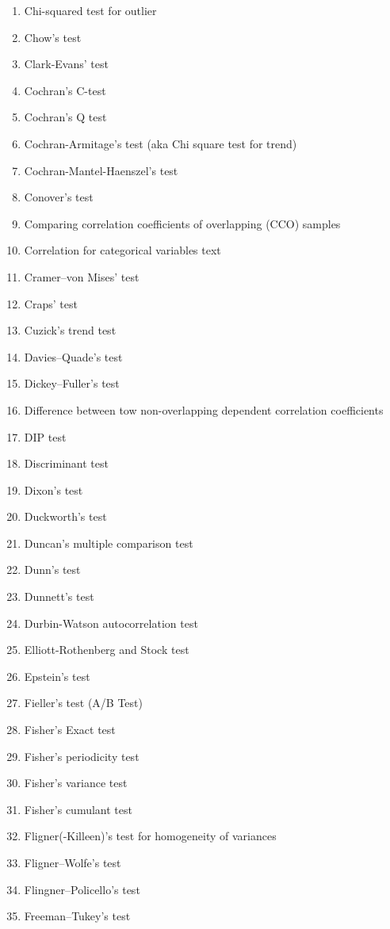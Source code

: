 \begin{itemize}
\begin{multicols}{3}
\begin{enumerate}
			\item Chi-squared test for outlier
			\item Chow's test
			\item Clark-Evans' test
			\item Cochran's C-test
			\item Cochran's Q test
			\item Cochran-Armitage's test (aka Chi square test for trend)
			\item Cochran-Mantel-Haenszel's test
			\item Conover's test
			\item Comparing correlation coefficients of overlapping (CCO) samples
			\item Correlation for categorical variables text
			\item Cramer–von Mises' test
			\item Craps' test
			\item Cuzick's trend test
			\item Davies–Quade's test
			\item Dickey–Fuller's test 
			\item Difference between tow non-overlapping dependent correlation coefficients
			\item DIP test
			\item Discriminant test 
			\item Dixon's test
			\item Duckworth's test
			\item Duncan's multiple comparison test
			\item Dunn's test
			\item Dunnett's test
			\item Durbin-Watson autocorrelation test
			\item Elliott-Rothenberg and Stock test
			\item Epstein's test
			\item Fieller's test (A/B Test)
			\item Fisher's Exact test
			\item Fisher's periodicity test
			\item Fisher's variance test
			\item Fisher's cumulant test
			\item Fligner(-Killeen)'s test for homogeneity of variances
			\item Fligner–Wolfe's test
			\item Flingner–Policello's test
			\item Freeman–Tukey's test

\end{enumerate}
\end{multicols}
\end{itemize}
